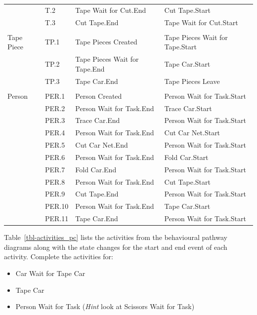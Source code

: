 \documentclass[
  10pt,
  a4paperpaper,
  DIV=11,
  numbers=noendperiod,
  oneside]{scrreprt}
\providecommand{\tightlist}{%
  \setlength{\itemsep}{0pt}\setlength{\parskip}{0pt}}\usepackage{longtable,booktabs,array}
\begin{document}
\begin{table}[H]
{\begin{tabular}{p{2.4cm}>{\raggedright\arraybackslash}p{1.2cm}>{\raggedright\arraybackslash}p{5.9cm}>{\raggedright\arraybackslash}p{5.9cm}}
       & T.2 & Tape Wait for Cut.End & Cut Tape.Start \\
       & T.3 & Cut Tape.End & Tape Wait for Cut.Start \\
       &      &              &              \\
Tape Piece & TP.1 & Tape Pieces Created & Tape Pieces Wait for Tape.Start \\
           & TP.2 & Tape Pieces Wait for Tape.End & Tape Car.Start \\
           & TP.3 & Tape Car.End & Tape Pieces Leave \\
     &      &              &              \\
Person & PER.1 & Person Created & Person Wait for Task.Start \\
       & PER.2 & Person Wait for Task.End & Trace Car.Start \\
       & PER.3 & Trace Car.End & Person Wait for Task.Start \\
       & PER.4 & Person Wait for Task.End & Cut Car Net.Start \\
       & PER.5 & Cut Car Net.End & Person Wait for Task.Start \\
       & PER.6 & Person Wait for Task.End & Fold Car.Start \\
       & PER.7 & Fold Car.End & Person Wait for Task.Start \\
       & PER.8 & Person Wait for Task.End & Cut Tape.Start \\
       & PER.9 & Cut Tape.End & Person Wait for Task.Start \\
       & PER.10 & Person Wait for Task.End & Tape Car.Start \\
       & PER.11 & Tape Car.End & Person Wait for Task.Start \\\bottomrule
\end{tabular}

}

\end{table}%

Table~\ref{tbl-activities_pc} lists the activities from the behavioural
pathway diagrams along with the state changes for the start and end
event of each activity. Complete the activities for:

\begin{itemize}
\tightlist
\item
  Car Wait for Tape Car
\item
  Tape Car
\item
  Person Wait for Task (\emph{Hint} look at Scissors Wait for Task)
\end{itemize}
\end{document}
